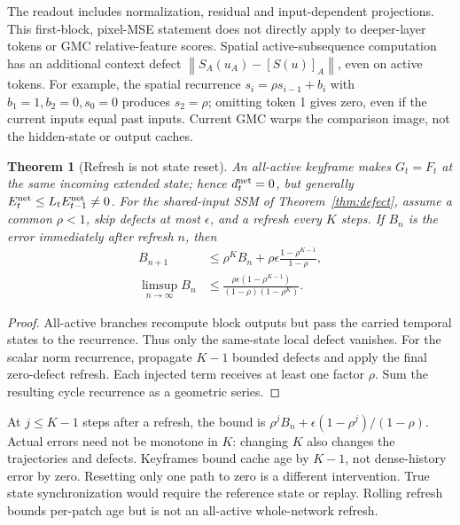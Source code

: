 \documentclass[11pt]{article}
\newtheorem{theorem}[proposition]{Theorem}
\newcommand{\norm}[1]{\left\lVert#1\right\rVert}
\begin{document}
The readout includes normalization, residual and input-dependent projections.
This first-block, pixel-MSE statement does not directly apply to deeper-layer
tokens or GMC relative-feature scores. Spatial active-subsequence computation
has an additional context defect
$\norm{S_A(u_A)-[S(u)]_A}$, even on active tokens. For example, the spatial
recurrence $s_i=\rho s_{i-1}+b_i$ with $b_1=1,b_2=0,s_0=0$ produces $s_2=\rho$;
omitting token 1 gives zero, even if the current inputs equal past inputs.
Current GMC warps the comparison image, not the hidden-state or output caches.

\begin{theorem}[Refresh is not state reset]\label{thm:refresh}
An all-active keyframe makes $G_t=F_t$ at the same incoming extended state;
hence $d_t^{\rm net}=0$, but generally
$E_t^{\rm net}\le L_tE_{t-1}^{\rm net}\ne0$.
For the shared-input SSM of Theorem~\ref{thm:defect}, assume a common
$\rho<1$, skip defects at most $\epsilon$, and a refresh every $K$ steps.
If $B_n$ is the error immediately after refresh $n$, then
\begin{align}
 B_{n+1}&\le\rho^KB_n+\rho\epsilon\frac{1-\rho^{K-1}}{1-\rho},\\
 \limsup_{n\to\infty}B_n&\le
 \frac{\rho\epsilon(1-\rho^{K-1})}{(1-\rho)(1-\rho^K)}.
\end{align}
\end{theorem}
\begin{proof}
All-active branches recompute block outputs but pass the carried temporal
states to the recurrence. Thus only the same-state local defect vanishes.
For the scalar norm recurrence, propagate $K-1$ bounded defects and apply
the final zero-defect refresh. Each injected term receives at least one
factor $\rho$. Sum the resulting cycle recurrence as a geometric series.
\end{proof}

At $j\le K-1$ steps after a refresh, the bound is
$\rho^jB_n+\epsilon(1-\rho^j)/(1-\rho)$. Actual errors need not be monotone
in $K$: changing $K$ also changes the trajectories and defects. Keyframes
bound cache age by $K-1$, not dense-history error by zero. Resetting only one
path to zero is a different intervention. True state synchronization would
require the reference state or replay. Rolling refresh bounds per-patch age
but is not an all-active whole-network refresh.
\end{document}
